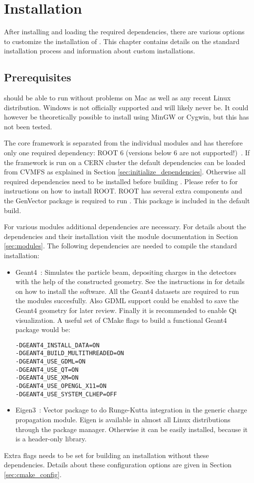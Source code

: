 \section{Installation}
\label{sec:installation}
After installing and loading the required dependencies, there are various options to customize the installation of \apsq. This chapter contains details on the standard installation process and information about custom installations.

\subsection{Prerequisites}
\label{sec:prerequisites}
\apsq should be able to run without problems on Mac as well as any recent Linux distribution. Windows is not officially supported and will likely never be. It could however be theoretically possible to install \apsq using MinGW or Cygwin, but this has not been tested.

The core framework is separated from the individual modules and \apsq has therefore only one required dependency: ROOT 6 (versions below 6 are not supported!)~\cite{root}. If the framework is run on a CERN cluster the default dependencies can be loaded from CVMFS as explained in Section \ref{sec:initialize_dependencies}. Otherwise all required dependencies need to be installed before building \apsq. Please refer to \cite{rootinstallation} for instructions on how to install ROOT. ROOT has several extra components and the GenVector package is required to run \apsq. This package is included in the default build.

For various modules additional dependencies are necessary. For details about the dependencies and their installation visit the module documentation in Section \ref{sec:modules}. The following dependencies are needed to compile the standard installation:
\begin{itemize}
\item Geant4~\cite{geant4}: Simulates the particle beam, depositing charges in the detectors with the help of the constructed geometry. See the instructions in \cite{geant4installation} for details on how to install the software. All the Geant4 datasets are required to run the modules succesfully. Also GDML support could be enabled to save the Geant4 geometry for later review. Finally it is recommended to enable Qt visualization. A useful set of CMake flags to build a functional Geant4 package would be:
\begin{verbatim}
-DGEANT4_INSTALL_DATA=ON
-DGEANT4_BUILD_MULTITHREADED=ON
-DGEANT4_USE_GDML=ON
-DGEANT4_USE_QT=ON
-DGEANT4_USE_XM=ON 
-DGEANT4_USE_OPENGL_X11=ON
-DGEANT4_USE_SYSTEM_CLHEP=OFF
\end{verbatim}
\item Eigen3~\cite{eigen3}: Vector package to do Runge-Kutta integration in the generic charge propagation module. Eigen is available in almost all Linux distributions through the package manager. Otherwise it can be easily installed, because it is a header-only library.
\end{itemize}
Extra flags needs to be set for building an \apsq installation without these dependencies. Details about these configuration options are given in Section \ref{sec:cmake_config}.

